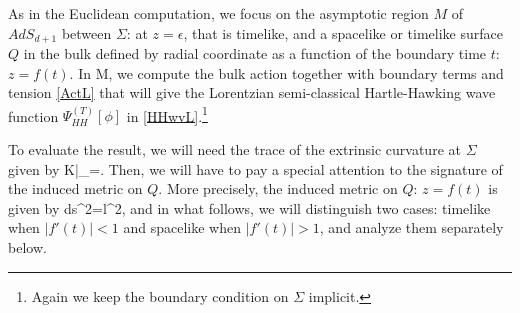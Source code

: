 \documentclass[a4paper,12pt]{article}
\begin{document}
As in the Euclidean computation, we focus on the asymptotic region $M$ of $AdS_{d+1}$ between $\Sigma$: at $z=\epsilon$, that is timelike, and a spacelike or timelike surface $Q$ in the bulk defined by radial coordinate as a function of the boundary time $t$: $z=f(t)$. In M, we compute the bulk action together with boundary terms and tension \eqref{ActL} that will give the Lorentzian semi-classical Hartle-Hawking wave function $\Psi^{(T)}_{HH}[\phi]$ in \eqref{HHwvL}.\footnote{Again we keep the boundary condition on $\Sigma$ implicit.} 

To evaluate the result, we will need the trace of the extrinsic curvature at $\Sigma$ given by 
\be 
K|_\Sigma=.
\ee
Then, we will have to pay a special attention to the signature of the induced metric on $Q$. More precisely, the induced metric on $Q$: $z=f(t)$ is given by
\be
ds^2=l^2,\label{IndMQLA}
\ee
and in what follows, we will distinguish two cases: timelike when $|f'(t)|<1$ and spacelike when $|f'(t)|>1$, and analyze them separately below.
\end{document}
